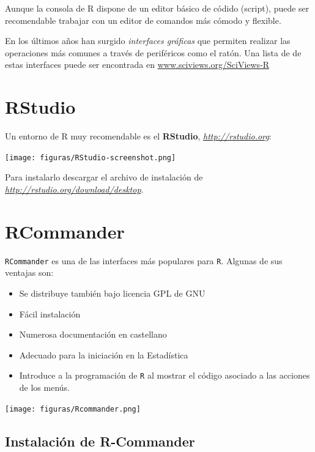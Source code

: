 \documentclass[
]{book}
\theoremstyle{break}
\begin{document}
Aunque la consola de R dispone de un editor básico de códido (script),
puede ser recomendable trabajar con un editor de comandos más cómodo y
flexible.

En los últimos años han surgido \emph{interfaces gráficas} que permiten
realizar las operaciones más comunes a través de periféricos como el
ratón. Una lista de de estas interfaces puede ser encontrada en
\url{www.sciviews.org/SciViews-R}

\hypertarget{rstudio}{%
\section{RStudio}\label{rstudio}}

Un entorno de R muy recomendable es el \textbf{RStudio},
\href{http://rstudio.org}{\emph{http://rstudio.org}}:

\texttt{[image: figuras/RStudio-screenshot.png]}

Para instalarlo descargar el archivo de instalación de
\href{http://rstudio.org/download/desktop}{\emph{http://rstudio.org/download/desktop}}.

\hypertarget{rcmdr}{%
\section{RCommander}\label{rcmdr}}

\texttt{RCommander} es una de las interfaces más populares para \texttt{R}. Algunas de
sus ventajas son:

\begin{itemize}
\item
  Se distribuye también bajo licencia GPL de GNU
\item
  Fácil instalación
\item
  Numerosa documentación en castellano
\item
  Adecuado para la iniciación en la Estadística
\item
  Introduce a la programación de \texttt{R} al mostrar el código asociado a
  las acciones de los menús.
\end{itemize}

\texttt{[image: figuras/Rcommander.png]}

\hypertarget{instalaciuxf3n-de-r-commander}{%
\subsection{Instalación de R-Commander}\label{instalaciuxf3n-de-r-commander}}
\end{document}
